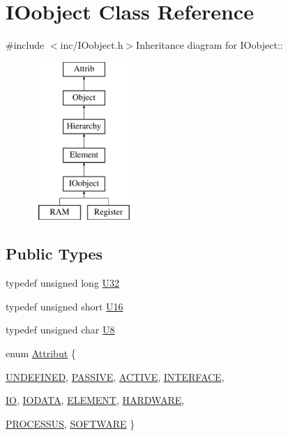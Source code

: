\hypertarget{classIOobject}{
\section{IOobject Class Reference}
\label{classIOobject}
}


{\ttfamily \#include $<$inc/IOobject.h$>$}Inheritance diagram for IOobject::\begin{figure}[H]
\begin{center}
\leavevmode
\includegraphics[height=6cm]{classIOobject}
\end{center}
\end{figure}
\subsection*{Public Types}
\begin{DoxyCompactItemize}
\item 
typedef unsigned long \hyperlink{classIOobject_ad5bc21e44080074fe1068dc83861a090}{U32}
\item 
typedef unsigned short \hyperlink{classIOobject_a260583f7e496b1979cb75adc9bbb7fc4}{U16}
\item 
typedef unsigned char \hyperlink{classIOobject_a14ca3894cb3b023d2a0b2d088fddfc90}{U8}
\item 
enum \hyperlink{classAttrib_a69e171d7cc6417835a5a306d3c764235}{Attribut} \{ \par
\hyperlink{classAttrib_a69e171d7cc6417835a5a306d3c764235a3a8da2ab97dda18aebab196fe4100531}{UNDEFINED}, 
\hyperlink{classAttrib_a69e171d7cc6417835a5a306d3c764235a2bfb2af57b87031d190a05fe25dd92ed}{PASSIVE}, 
\hyperlink{classAttrib_a69e171d7cc6417835a5a306d3c764235a3b1fec929c0370d1436f2f06e298fb0d}{ACTIVE}, 
\hyperlink{classAttrib_a69e171d7cc6417835a5a306d3c764235aa27c16b480a369ea4d18b07b2516bbc7}{INTERFACE}, 
\par
\hyperlink{classAttrib_a69e171d7cc6417835a5a306d3c764235a1420a5b8c0540b2af210b6975eded7f9}{IO}, 
\hyperlink{classAttrib_a69e171d7cc6417835a5a306d3c764235a0af3b0d0ac323c1704e6c69cf90add28}{IODATA}, 
\hyperlink{classAttrib_a69e171d7cc6417835a5a306d3c764235a7788bc5dd333fd8ce18562b269c9dab1}{ELEMENT}, 
\hyperlink{classAttrib_a69e171d7cc6417835a5a306d3c764235a61ceb22149f365f1780d18f9d1459423}{HARDWARE}, 
\par
\hyperlink{classAttrib_a69e171d7cc6417835a5a306d3c764235a75250e29692496e73effca2c0330977f}{PROCESSUS}, 
\hyperlink{classAttrib_a69e171d7cc6417835a5a306d3c764235a103a67cd0b8f07ef478fa45d4356e27b}{SOFTWARE}
 \}
\end{DoxyCompactItemize}
